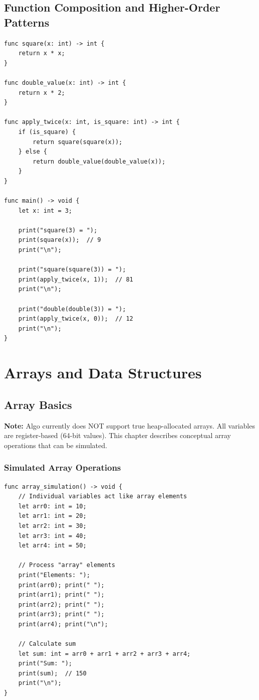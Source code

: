 \documentclass[12pt,a4paper,oneside]{book}
\begin{document}
\section{Function Composition and Higher-Order Patterns}

\begin{lstlisting}[style=algo, caption={Function Composition}]
func square(x: int) -> int {
    return x * x;
}

func double_value(x: int) -> int {
    return x * 2;
}

func apply_twice(x: int, is_square: int) -> int {
    if (is_square) {
        return square(square(x));
    } else {
        return double_value(double_value(x));
    }
}

func main() -> void {
    let x: int = 3;
    
    print("square(3) = ");
    print(square(x));  // 9
    print("\n");
    
    print("square(square(3)) = ");
    print(apply_twice(x, 1));  // 81
    print("\n");
    
    print("double(double(3)) = ");
    print(apply_twice(x, 0));  // 12
    print("\n");
}
\end{lstlisting}

\chapter{Arrays and Data Structures}

\section{Array Basics}

\textbf{Note:} Algo currently does NOT support true heap-allocated arrays. All variables are register-based (64-bit values). This chapter describes conceptual array operations that can be simulated.

\subsection{Simulated Array Operations}

\begin{lstlisting}[style=algo, caption={Array-Style Variables}]
func array_simulation() -> void {
    // Individual variables act like array elements
    let arr0: int = 10;
    let arr1: int = 20;
    let arr2: int = 30;
    let arr3: int = 40;
    let arr4: int = 50;
    
    // Process "array" elements
    print("Elements: ");
    print(arr0); print(" ");
    print(arr1); print(" ");
    print(arr2); print(" ");
    print(arr3); print(" ");
    print(arr4); print("\n");
    
    // Calculate sum
    let sum: int = arr0 + arr1 + arr2 + arr3 + arr4;
    print("Sum: ");
    print(sum);  // 150
    print("\n");
}
\end{lstlisting}
\end{document}
